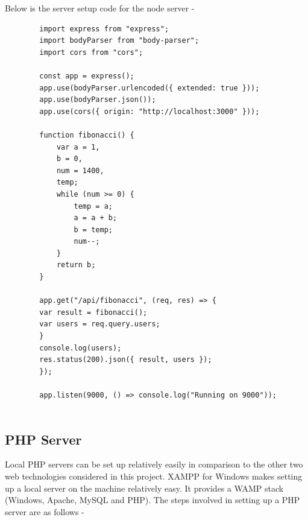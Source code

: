 \documentclass[../thesis.tex]{subfiles}
\begin{document}
	Below is the server setup code for the node server - 
	\begin{Verbatim}
		import express from "express";
		import bodyParser from "body-parser";
		import cors from "cors";
		
		const app = express();		
		app.use(bodyParser.urlencoded({ extended: true }));
		app.use(bodyParser.json());
		app.use(cors({ origin: "http://localhost:3000" }));
		
		function fibonacci() {
			var a = 1,
			b = 0,
			num = 1400,
			temp;		
			while (num >= 0) {
				temp = a;
				a = a + b;
				b = temp;
				num--;
			}		
			return b;
		}
		
		app.get("/api/fibonacci", (req, res) => {
		var result = fibonacci();
		var users = req.query.users;
		}
		console.log(users);
		res.status(200).json({ result, users });
		});
		
		app.listen(9000, () => console.log("Running on 9000"));
		
	\end{Verbatim}
	
	\subsection*{PHP Server}
	Local PHP servers can be set up relatively easily in comparison to the other two web technologies considered in this project. XAMPP for Windows makes setting up a local server on the machine relatively easy. It provides a WAMP stack (Windows, Apache, MySQL and PHP). The steps involved in setting up a PHP server are as follows -
	\newline
\end{document}
